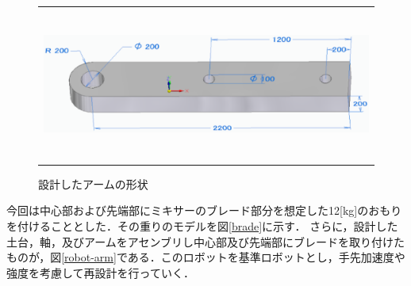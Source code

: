 \begin{figure}[htbp]
  \begin{center}
    \begin{tabular}{c}
      \includegraphics[height=5.0cm]{img/eps/default-robot-arm.eps}
    \end{tabular}
    \caption{設計したアームの形状}
    \label{default-robot-arm}
  \end{center}
\end{figure}

今回は中心部および先端部にミキサーのブレード部分を想定した12{[}kg{]}のおもりを付けることとした．その重りのモデルを図\ref{brade}に示す．
さらに，設計した土台，軸，及びアームをアセンブリし中心部及び先端部にブレードを取り付けたものが，図\ref{robot-arm}である．このロボットを基準ロボットとし，手先加速度や強度を考慮して再設計を行っていく．

